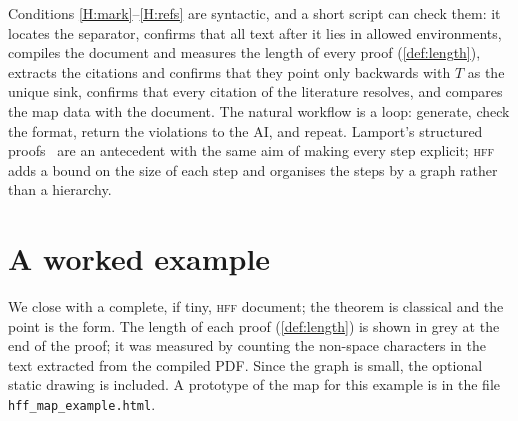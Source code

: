 \documentclass[11pt]{article}
\theoremstyle{plain}
\theoremstyle{definition}
\theoremstyle{remark}
\theoremstyle{definition}
\theoremstyle{plain}
\theoremstyle{remark}
\newcommand{\HFF}{\textsc{hff}}
\begin{document}
Conditions \ref{H:mark}--\ref{H:refs} are syntactic, and a short script can check them: it locates the separator, confirms that all text after it lies in allowed environments, compiles the document and measures the length of every proof (\cref{def:length}), extracts the citations and confirms that they point only backwards with $T$ as the unique sink, confirms that every citation of the literature resolves, and compares the map data with the document. The natural workflow is a loop: generate, check the format, return the violations to the AI, and repeat. Lamport's structured proofs~\cite{Lamport1995, Lamport2012} are an antecedent with the same aim of making every step explicit; \HFF{} adds a bound on the size of each step and organises the steps by a graph rather than a hierarchy.

\section{A worked example}\label{sec:example}

We close with a complete, if tiny, \HFF{} document; the theorem is classical and the point is the form. The length of each proof (\cref{def:length}) is shown in grey at the end of the proof; it was measured by counting the non-space characters in the text extracted from the compiled PDF. Since the graph is small, the optional static drawing is included. A prototype of the map for this example is in the file \texttt{hff\_map\_example.html}.
\end{document}
